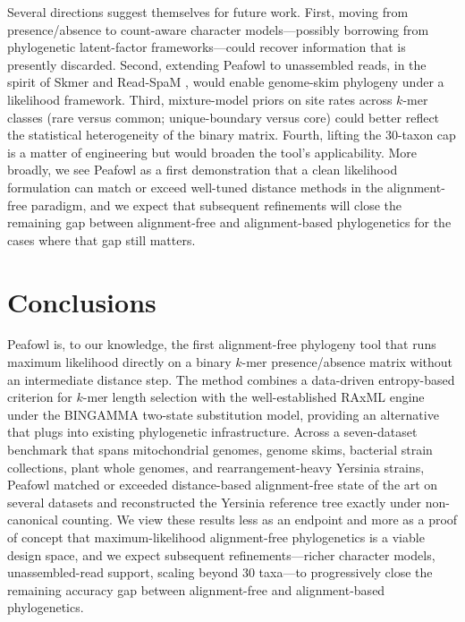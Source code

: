 \documentclass[11pt]{article}
\begin{document}
Several directions suggest themselves for future work. First, moving from
presence/absence to count-aware character models---possibly borrowing from
phylogenetic latent-factor frameworks---could recover information that is
presently discarded. Second, extending Peafowl to unassembled reads, in
the spirit of Skmer \citep{sarmashghi2019skmer} and Read-SpaM
\citep{lau2019readspam}, would enable genome-skim phylogeny under a
likelihood framework. Third, mixture-model priors on site rates across
$k$-mer classes (rare versus common; unique-boundary versus core) could
better reflect the statistical heterogeneity of the binary matrix.
Fourth, lifting the 30-taxon cap is a matter of engineering but would
broaden the tool's applicability. More broadly, we see Peafowl as a first
demonstration that a clean likelihood formulation can match or exceed
well-tuned distance methods in the alignment-free paradigm, and we expect
that subsequent refinements will close the remaining gap between
alignment-free and alignment-based phylogenetics for the cases where that
gap still matters.

\section{Conclusions}

Peafowl is, to our knowledge, the first alignment-free phylogeny tool that
runs maximum likelihood directly on a binary $k$-mer presence/absence
matrix without an intermediate distance step. The method combines a
data-driven entropy-based criterion for $k$-mer length selection with the
well-established RAxML engine under the BINGAMMA two-state substitution
model, providing an alternative that plugs into existing phylogenetic
infrastructure. Across a seven-dataset benchmark that spans mitochondrial
genomes, genome skims, bacterial strain collections, plant whole genomes,
and rearrangement-heavy Yersinia strains, Peafowl matched or exceeded
distance-based alignment-free state of the art on several datasets and
reconstructed the Yersinia reference tree exactly under non-canonical
counting. We view these results less as an endpoint and more as a proof of
concept that maximum-likelihood alignment-free phylogenetics is a viable
design space, and we expect subsequent refinements---richer character
models, unassembled-read support, scaling beyond 30 taxa---to progressively
close the remaining accuracy gap between alignment-free and alignment-based
phylogenetics.



\end{document}
